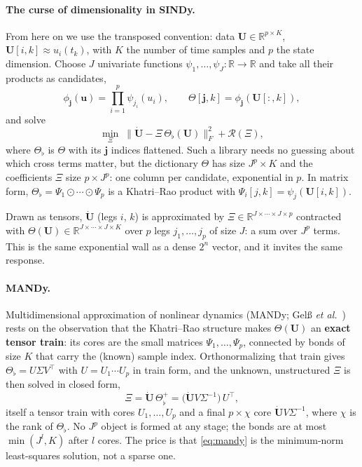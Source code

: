 \paragraph{The curse of dimensionality in SINDy.}
From here on we use the transposed convention: data
$\mathbf U\in\mathbb R^{p\times K}$, $\mathbf U[i,k] \approx u_i(t_k)$, with $K$
the number of time samples and $p$ the state dimension. Choose $J$ univariate
functions $\psi_1,\dots,\psi_J:\mathbb R\to\mathbb R$ and take all their
products as candidates,
\begin{equation}
  \phi_{\mathbf j}(\mathbf u) = \prod_{i=1}^{p} \psi_{j_i}(u_i), \qquad
  \Theta[\mathbf j, k] = \phi_{\mathbf j}(\mathbf U[:,k]),
  \label{eq:product-dictionary}
\end{equation}%
and solve
\begin{equation}
  \min_{\Xi}\; \bigl\lVert \dot{\mathbf U} - \Xi\,\Theta_\flat(\mathbf U) \bigr\rVert_F^2
  + \mathcal R(\Xi),
  \label{eq:sindy-regularized}
\end{equation}%
where $\Theta_\flat$ is $\Theta$ with its $\mathbf j$ indices flattened. Such a
library needs no guessing about which cross terms matter, but the dictionary
$\Theta$ has size $J^p\times K$ and the coefficients $\Xi$ size $p\times J^p$:
one column per candidate, exponential in $p$. In matrix form,
$\Theta_\flat = \Psi_1 \odot \cdots \odot \Psi_p$ is a Khatri--Rao product
with $\Psi_i[j,k] = \psi_j(\mathbf U[i,k])$.

Drawn as tensors, $\dot{\mathbf U}$ (legs $i$, $k$) is approximated by
$\Xi\in\mathbb R^{J\times\cdots\times J\times p}$ contracted with
$\Theta(\mathbf U)\in\mathbb R^{J\times\cdots\times J\times K}$ over $p$ legs
$j_1,\dots,j_p$ of size $J$: a sum over $J^p$ terms. This is the same
exponential wall as a dense $2^n$ vector, and it invites the same response.

\paragraph{MANDy.}
Multidimensional approximation of nonlinear dynamics (MANDy; Gel\ss{} \emph{et
al.}~\cite{Gelss2019}) rests on the observation that the Khatri--Rao structure
makes $\Theta(\mathbf U)$ an \textbf{exact tensor train}: its cores are the
small matrices $\Psi_1,\dots,\Psi_p$, connected by bonds of size $K$ that carry
the (known) sample index. Orthonormalizing that train gives
$\Theta_\flat = U\Sigma V^\top$ with $U = U_1\cdots U_p$ in train form, and the
unknown, unstructured $\Xi$ is then solved in closed form,
\begin{equation}
  \Xi = \dot{\mathbf U}\,\Theta_\flat^{+}
      = \bigl(\dot{\mathbf U} V \Sigma^{-1}\bigr)\, U^\top ,
  \label{eq:mandy}
\end{equation}%
itself a tensor train with cores $U_1,\dots,U_p$ and a final $p\times\chi$ core
$\dot{\mathbf U}V\Sigma^{-1}$, where $\chi$ is the rank of $\Theta_\flat$. No
$J^p$ object is formed at any stage; the bonds are at most $\min(J^l, K)$ after
$l$ cores. The price is that \eqref{eq:mandy} is the minimum-norm least-squares
solution, not a sparse one.

